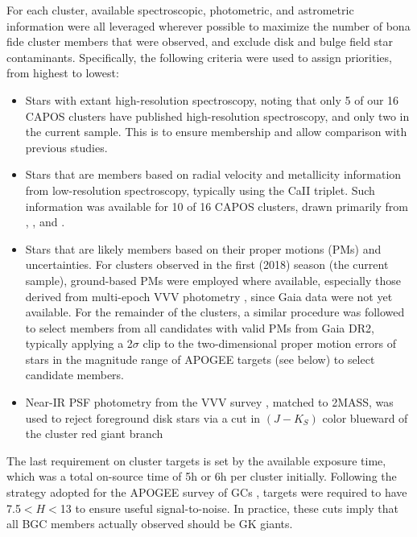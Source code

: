 \documentclass[onecolumn]{aa}
\begin{document}
For each cluster, available spectroscopic, photometric, and astrometric information were all leveraged wherever possible to maximize the number of bona fide cluster members that were observed, and exclude disk and bulge field star contaminants.  Specifically, the following criteria were used to assign priorities, from highest to lowest:
\begin{itemize}
    \item Stars with extant high-resolution spectroscopy, noting that only 5 of our 16 CAPOS clusters have published high-resolution spectroscopy, and only two in the current sample. This is to ensure membership and allow comparison with previous studies.

    \item Stars that are members based on radial velocity and metallicity information from low-resolution spectroscopy, typically using the CaII triplet.  Such information was available for 10 of 16  CAPOS clusters, drawn primarily from \citet{Mauro2014}, \citet{Dias2016}, and \citet{Geisler2021}.
    
    \item Stars that are likely members based on their proper motions (PMs) and uncertainties. For clusters observed in the first (2018) season (the current sample), ground-based PMs were employed where available, especially those derived from multi-epoch VVV photometry \citep{ContrerasRamos2017}, since Gaia data were not yet available.
      For the remainder of the clusters, a similar procedure was followed to select members from all candidates with valid PMs from Gaia DR2, typically applying a 2$\sigma$ clip to the two-dimensional proper motion errors of stars in the magnitude range of APOGEE targets (see below) to select candidate members.    
    
    \item Near-IR PSF photometry from the VVV survey \citep{Cohen2017, Alonso-Garcia2018}, matched to 2MASS, was used to reject foreground disk stars via a cut in $(J-K_{S})$ color blueward of the cluster red giant branch
    
\end{itemize}

The last requirement on cluster targets is set by the available exposure time, which was a total on-source time of 5h or 6h per cluster initially.  Following the strategy adopted for the APOGEE survey of GCs \citep{Zasowski2017}, targets were required to have 7.5$< H <$13 to ensure useful signal-to-noise.  In practice, these cuts imply that all BGC members actually observed should be GK giants.  
\end{document}
